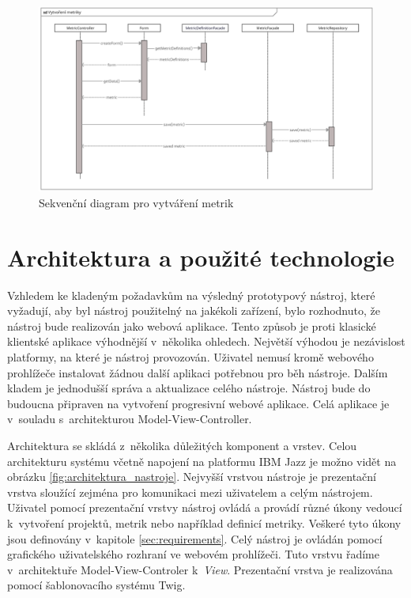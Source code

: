 \documentclass[czech,master]{diploma}
\begin{document}
\begin{figure}[!ht]
    \centering
    \includegraphics[width=1\textwidth]{Diplomka/Figures/sd_metric.png}
    \caption{Sekvenční diagram pro vytváření metrik}
    \label{fig:sd_metric}
\end{figure}

\section{Architektura a použité technologie}
Vzhledem ke kladeným požadavkům na výsledný prototypový nástroj, které vyžadují, aby byl nástroj použitelný na jakékoli zařízení, bylo rozhodnuto, že nástroj bude realizován jako webová aplikace. Tento způsob je proti klasické klientské aplikace výhodnější v~několika ohledech. Největší výhodou je nezávislost platformy, na které je nástroj provozován. Uživatel nemusí kromě webového prohlížeče instalovat žádnou další aplikaci potřebnou pro běh nástroje. Dalším kladem je jednodušší správa a aktualizace celého nástroje. Nástroj bude do budoucna připraven na vytvoření progresivní webové aplikace. Celá aplikace je v~souladu s~architekturou Model-View-Controller.

Architektura se skládá z~několika důležitých komponent a vrstev. Celou architekturu systému včetně napojení na platformu IBM Jazz je možno vidět na obrázku \ref{fig:architektura_nastroje}. Nejvyšší vrstvou nástroje je prezentační vrstva sloužící zejména pro komunikaci mezi uživatelem a celým nástrojem. Uživatel pomocí prezentační vrstvy nástroj ovládá a provádí různé úkony vedoucí k~vytvoření projektů, metrik nebo například definicí metriky. Veškeré tyto úkony jsou definovány v~kapitole \ref{sec:requirements}. Celý nástroj je ovládán pomocí grafického uživatelského rozhraní ve webovém prohlížeči. Tuto vrstvu řadíme v~architektuře Model-View-Controler k~\textit{View}. Prezentační vrstva je realizována pomocí šablonovacího systému Twig.
\end{document}
